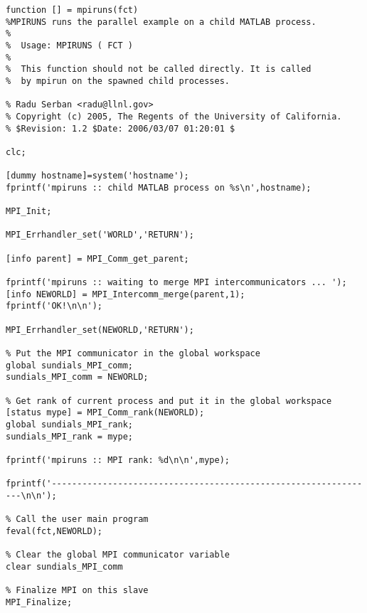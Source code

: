 \begin{lstlisting}[linerange={1-1,8-51}]
function [] = mpiruns(fct)
%MPIRUNS runs the parallel example on a child MATLAB process.
%
%  Usage: MPIRUNS ( FCT )
%
%  This function should not be called directly. It is called
%  by mpirun on the spawned child processes.

% Radu Serban <radu@llnl.gov>
% Copyright (c) 2005, The Regents of the University of California.
% $Revision: 1.2 $Date: 2006/03/07 01:20:01 $

clc;

[dummy hostname]=system('hostname');
fprintf('mpiruns :: child MATLAB process on %s\n',hostname);

MPI_Init;

MPI_Errhandler_set('WORLD','RETURN');

[info parent] = MPI_Comm_get_parent;

fprintf('mpiruns :: waiting to merge MPI intercommunicators ... ');
[info NEWORLD] = MPI_Intercomm_merge(parent,1);
fprintf('OK!\n\n');

MPI_Errhandler_set(NEWORLD,'RETURN');

% Put the MPI communicator in the global workspace
global sundials_MPI_comm;
sundials_MPI_comm = NEWORLD;

% Get rank of current process and put it in the global workspace
[status mype] = MPI_Comm_rank(NEWORLD);
global sundials_MPI_rank;
sundials_MPI_rank = mype;

fprintf('mpiruns :: MPI rank: %d\n\n',mype);

fprintf('----------------------------------------------------------------\n\n');

% Call the user main program
feval(fct,NEWORLD);

% Clear the global MPI communicator variable
clear sundials_MPI_comm

% Finalize MPI on this slave
MPI_Finalize;\end{lstlisting}
